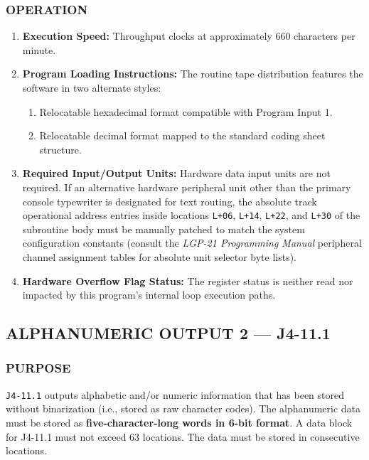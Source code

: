 \subsubsection*{OPERATION}
\begin{enumerate}
    \item \textbf{Execution Speed:} Throughput clocks at approximately 660 characters per minute.
    \item \textbf{Program Loading Instructions:} The routine tape distribution features the software in two alternate styles:
    \begin{enumerate}[label=\alph*)]
        \item Relocatable hexadecimal format compatible with Program Input 1.
        \item Relocatable decimal format mapped to the standard coding sheet structure.
    \end{enumerate}
    \item \textbf{Required Input/Output Units:} Hardware data input units are not required. If an alternative hardware peripheral unit other than the primary console typewriter is designated for text routing, the absolute track operational address entries inside locations \texttt{L+06}, \texttt{L+14}, \texttt{L+22}, and \texttt{L+30} of the subroutine body must be manually patched to match the system configuration constants (consult the \textit{LGP-21 Programming Manual} peripheral channel assignment tables for absolute unit selector byte lists).
    \item \textbf{Hardware Overflow Flag Status:} The register status is neither read nor impacted by this program's internal loop execution paths.
\end{enumerate}


\subsection*{ALPHANUMERIC OUTPUT 2 --- J4-11.1}

\subsubsection*{PURPOSE}
\texttt{J4-11.1} outputs alphabetic and/or numeric information that has been stored without binarization (i.e., stored as raw character codes). The alphanumeric data must be stored as \textbf{five-character-long words in 6-bit format}. A data block for J4-11.1 must not exceed 63 locations. The data must be stored in consecutive locations.

